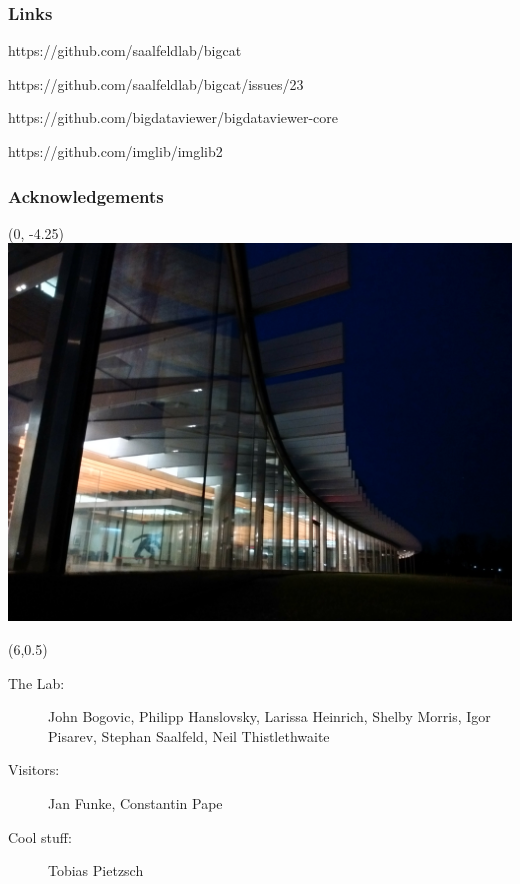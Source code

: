 \documentclass[aspectratio=169,table]{beamer}
\begin{document}
\begin{frame}
    \frametitle{Links}
    \centering
    \scriptsize
    \begin{description}[leftmargin=3.5cm,style=multiline,font=\scriptsize]
          \item[BigCAT] https://github.com/saalfeldlab/bigcat
          \item[Rename BigCAT] https://github.com/saalfeldlab/bigcat/issues/23
          \item[BigDataViewer] https://github.com/bigdataviewer/bigdataviewer-core
          \item[imglib2] https://github.com/imglib/imglib2
    \end{description}
\end{frame}

\begin{frame}
    \frametitle{Acknowledgements}
    \begin{textblock}{16}(0, -4.25) 
        \includegraphics[width=\textwidth]{fig/janelia.jpg}
    \end{textblock}%
    \begin{textblock}{9.8}(6,0.5)
        \scriptsize%
        \begin{description}
              \item[The Lab:]{\color{white}John Bogovic, Philipp Hanslovsky, Larissa Heinrich, Shelby Morris, Igor Pisarev, Stephan Saalfeld, Neil Thistlethwaite}
              \item[Visitors:]{\color{white}Jan Funke, Constantin Pape}
              \item[Cool stuff:]{\color{white}Tobias Pietzsch}
\end{description}
\end{textblock}
\end{frame}

    
\end{document}
